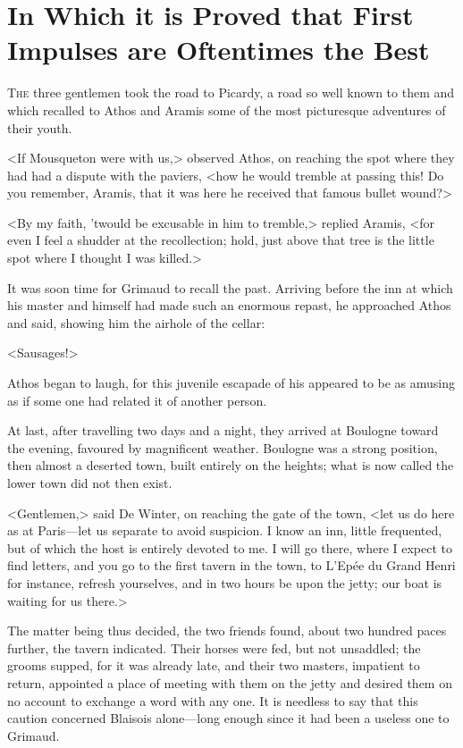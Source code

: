 \chapter[First Impulses are Oftentimes the Best]{In Which it is Proved that First Impulses are Oftentimes the Best}



 \lettrine{T}{he} three gentlemen took the road to Picardy, a road so well known to them and which recalled to Athos and Aramis some of the most picturesque adventures of their youth.

\zz
<If Mousqueton were with us,> observed Athos, on reaching the spot where they had had a dispute with the paviers, <how he would tremble at passing this! Do you remember, Aramis, that it was here he received that famous bullet wound?>

<By my faith, 'twould be excusable in him to tremble,> replied Aramis, <for even I feel a shudder at the recollection; hold, just above that tree is the little spot where I thought I was killed.>

It was soon time for Grimaud to recall the past. Arriving before the inn at which his master and himself had made such an enormous repast, he approached Athos and said, showing him the airhole of the cellar:

<Sausages!>

Athos began to laugh, for this juvenile escapade of his appeared to be as amusing as if some one had related it of another person.

At last, after travelling two days and a night, they arrived at Boulogne toward the evening, favoured by magnificent weather. Boulogne was a strong position, then almost a deserted town, built entirely on the heights; what is now called the lower town did not then exist.

<Gentlemen,> said De Winter, on reaching the gate of the town, <let us do here as at Paris—let us separate to avoid suspicion. I know an inn, little frequented, but of which the host is entirely devoted to me. I will go there, where I expect to find letters, and you go to the first tavern in the town, to L'Epée du Grand Henri for instance, refresh yourselves, and in two hours be upon the jetty; our boat is waiting for us there.>

The matter being thus decided, the two friends found, about two hundred paces further, the tavern indicated. Their horses were fed, but not unsaddled; the grooms supped, for it was already late, and their two masters, impatient to return, appointed a place of meeting with them on the jetty and desired them on no account to exchange a word with any one. It is needless to say that this caution concerned Blaisois alone—long enough since it had been a useless one to Grimaud.

